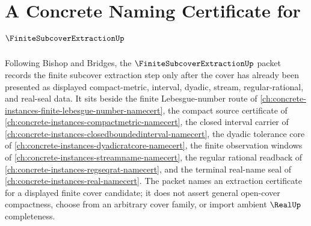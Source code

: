 \chapter{A Concrete Naming Certificate for $\FiniteSubcoverExtractionUp$}
\label{ch:concrete-instances-finite-subcover-extraction-namecert}

Following Bishop and Bridges, the $\FiniteSubcoverExtractionUp$ packet records the finite subcover extraction step only after the cover has already been presented as displayed compact-metric, interval, dyadic, stream, regular-rational, and real-seal data. It sits beside the finite Lebesgue-number route of \autoref{ch:concrete-instances-finite-lebesgue-number-namecert}, the compact source certificate of \autoref{ch:concrete-instances-compactmetric-namecert}, the closed interval carrier of \autoref{ch:concrete-instances-closedboundedinterval-namecert}, the dyadic tolerance core of \autoref{ch:concrete-instances-dyadicratcore-namecert}, the finite observation windows of \autoref{ch:concrete-instances-streamname-namecert}, the regular rational readback of \autoref{ch:concrete-instances-regseqrat-namecert}, and the terminal real-name seal of \autoref{ch:concrete-instances-real-namecert}. The packet names an extraction certificate for a displayed finite cover candidate; it does not assert general open-cover compactness, choose from an arbitrary cover family, or import ambient $\RealUp$ completeness.

